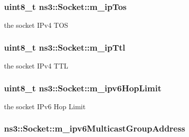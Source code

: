 \subsubsection[{\texorpdfstring{m\+\_\+ip\+Tos}{m_ipTos}}]{\setlength{\rightskip}{0pt plus 5cm}uint8\+\_\+t ns3\+::\+Socket\+::m\+\_\+ip\+Tos\hspace{0.3cm}{\ttfamily [private]}}\hypertarget{classns3_1_1Socket_a14aa2460d254debfb638f454a6f4ab61}{}\label{classns3_1_1Socket_a14aa2460d254debfb638f454a6f4ab61}


the socket I\+Pv4 T\+OS 

\subsubsection[{\texorpdfstring{m\+\_\+ip\+Ttl}{m_ipTtl}}]{\setlength{\rightskip}{0pt plus 5cm}uint8\+\_\+t ns3\+::\+Socket\+::m\+\_\+ip\+Ttl\hspace{0.3cm}{\ttfamily [private]}}\hypertarget{classns3_1_1Socket_a42f3bc6364dd1fdf28272b8ce44745e2}{}\label{classns3_1_1Socket_a42f3bc6364dd1fdf28272b8ce44745e2}


the socket I\+Pv4 T\+TL 

\subsubsection[{\texorpdfstring{m\+\_\+ipv6\+Hop\+Limit}{m_ipv6HopLimit}}]{\setlength{\rightskip}{0pt plus 5cm}uint8\+\_\+t ns3\+::\+Socket\+::m\+\_\+ipv6\+Hop\+Limit\hspace{0.3cm}{\ttfamily [private]}}\hypertarget{classns3_1_1Socket_a44885a08bce974cbfa1b5ea68c806967}{}\label{classns3_1_1Socket_a44885a08bce974cbfa1b5ea68c806967}


the socket I\+Pv6 Hop Limit 

\subsubsection[{\texorpdfstring{m\+\_\+ipv6\+Multicast\+Group\+Address}{m_ipv6MulticastGroupAddress}}]{ ns3\+::\+Socket\+::m\+\_\+ipv6\+Multicast\+Group\+Address\hspace{0.3cm}{\ttfamily [protected]}}\hypertarget{classns3_1_1Socket_a5745d9cdf891f3f0c06b124c4b679ef9}{}\label{classns3_1_1Socket_a5745d9cdf891f3f0c06b124c4b679ef9}


